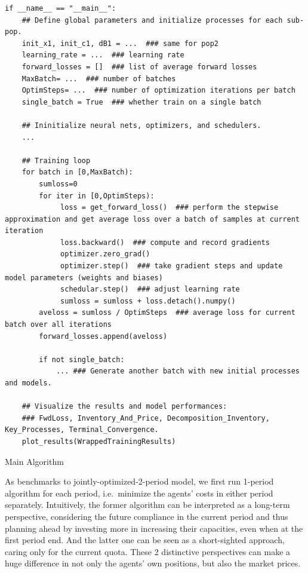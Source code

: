 \documentclass[a4paper,10pt]{article}
\newcommand{\1}{\mathbf{1}}
\begin{document}
\begin{algorithm}[h]
\begin{verbatim}
if __name__ == "__main__":
    ## Define global parameters and initialize processes for each sub-pop. 
    init_x1, init_c1, dB1 = ...  ### same for pop2
    learning_rate = ...  ### learning rate
    forward_losses = []  ### list of average forward losses
    MaxBatch= ...  ### number of batches
    OptimSteps= ...  ### number of optimization iterations per batch
    single_batch = True  ### whether train on a single batch 

    ## Ininitialize neural nets, optimizers, and schedulers.
    ...

    ## Training loop
    for batch in [0,MaxBatch):
        sumloss=0
        for iter in [0,OptimSteps):
             loss = get_forward_loss()  ### perform the stepwise approximation and get average loss over a batch of samples at current iteration
             loss.backward()  ### compute and record gradients
             optimizer.zero_grad()  
             optimizer.step()  ### take gradient steps and update model parameters (weights and biases)
             schedular.step()  ### adjust learning rate
             sumloss = sumloss + loss.detach().numpy() 
        aveloss = sumloss / OptimSteps  ### average loss for current batch over all iterations
        forward_losses.append(aveloss)
    
        if not single_batch:
            ... ### Generate another batch with new initial processes and models. 
    
    ## Visualize the results and model performances:
    ### FwdLoss, Inventory_And_Price, Decomposition_Inventory, Key_Processes, Terminal_Convergence.
    plot_results(WrappedTrainingResults)
\end{verbatim}
\caption{Main Algorithm}\label{alg:main-alg}
\end{algorithm}


As benchmarks to jointly-optimized-2-period model, we first run 1-period
algorithm for each period, i.e.~minimize the agents' costs in either
period separately. Intuitively, the former algorithm can be interpreted
as a long-term perspective, considering the future compliance in the
current period and thus planning ahead by investing more in increasing
their capacities, even when at the first period end. And the latter one
can be seen as a short-sighted approach, caring only for the current
quota. These 2 distinctive perspectives can make a huge difference in
not only the agents' own positions, but also the market prices.
\end{document}
